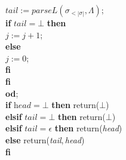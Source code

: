 \documentclass[adraft]{eptcs}
\begin{document}
\begin{minipage}{3in}
\quad \quad \quad \quad $\textit{tail} := \textit{parseL}(\sigma_{< |\sigma|},\Lambda)$; \\ \mbox{}
\quad \quad \quad \quad  \textbf{if} $\textit{tail}=\bot$ \textbf{then} \\ \mbox{}
\quad \quad \quad \quad \quad $j:=j+1$; \\ \mbox{}
\quad \quad \quad \quad  \textbf{else}  \\ \mbox{}
\quad \quad \quad \quad \quad $j:=0$; \\ \mbox{}
\quad \quad \quad \quad \textbf{fi} \\ \mbox{}
\quad \quad \quad \textbf{fi} \\ \mbox{}
\quad \quad \textbf{od}; \\ \mbox{}
\quad \quad  \textbf{if} $\textit{head}=\bot$ \textbf{then} return($\bot$) \\ \mbox{}
\quad \quad  \textbf{elsif} $\textit{tail}=\bot$ \textbf{then} return($\bot$) \\ \mbox{}
\quad \quad  \textbf{elsif} $\textit{tail}=\epsilon$ \textbf{then} return(\textit{head}) \\ \mbox{}
\quad \quad  \textbf{else} return(\textit{tail},\,\textit{head}) \\ \mbox{}
\quad \textbf{fi} \\ \mbox{}
\end{minipage}
\newpage
\end{document}
